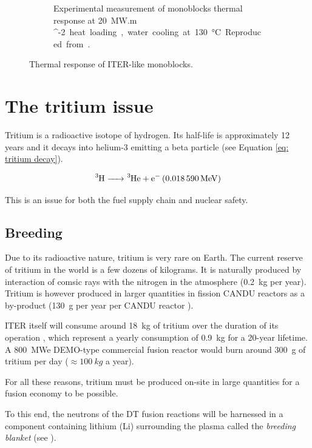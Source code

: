 \begin{figure} [h]
\begin{subfigure}[t]{0.45\linewidth}
            \caption{Experimental measurement of monoblocks thermal response at \SI{20}{MW.m ^{-2}} heat loading, water cooling at \SI{130}{\celsius}. Reproduced from \cite{visca_manufacturing_2018}.}
    \end{subfigure}
    \caption{Thermal response of ITER-like monoblocks.}
\end{figure}

\section{The tritium issue} \label{the tritium issue}

Tritium is a radioactive isotope of hydrogen.
Its half-life is approximately 12 years and it decays into helium-3 emitting a beta particle (see Equation \ref{eq: tritium decay}).

\begin{equation}
    \ce{^3H -> ^3He + e^- (\SI{0.018590}{MeV})}
    \label{eq: tritium decay}
\end{equation}

This is an issue for both the fuel supply chain and nuclear safety.

\subsection{Breeding}
Due to its radioactive nature, tritium is very rare on Earth.
The current reserve of tritium in the world is a few dozens of kilograms.
It is naturally produced by interaction of comsic rays with the nitrogen in the atmosphere (\SI{0.2}{kg} per year).
Tritium is however produced in larger quantities in fission CANDU reactors as a by-product (\SI{130}{g} per year per CANDU reactor ).

ITER itself will consume around \SI{18}{kg} of tritium over the duration of its operation , which represent a yearly consumption of \SI{0.9}{kg} for a 20-year lifetime.
A \SI{800}{MWe} DEMO-type commercial fusion reactor would burn around \SI{300}{g} of tritium per day ($\approx \SI{100}{kg}$ a year).

For all these reasons, tritium must be produced on-site in large quantities for a fusion economy to be possible.

To this end, the neutrons of the DT fusion reactions will be harnessed in a component containing lithium (Li) surrounding the plasma called the \textit{breeding blanket} (see ).


